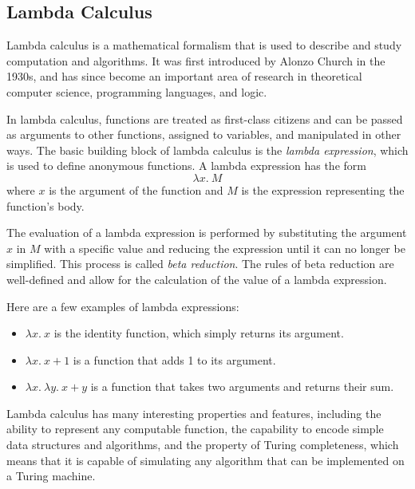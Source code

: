 \documentclass{article}
\begin{document}
\pagebreak 

\subsection*{Lambda Calculus}

Lambda calculus is a mathematical formalism that is used to describe and study computation and algorithms. It was first introduced by Alonzo Church in the 1930s, and has since become an important area of research in theoretical computer science, programming languages, and logic.

\vspace{3mm}
In lambda calculus, functions are treated as first-class citizens and can be passed as arguments to other functions, assigned to variables, and manipulated in other ways. The basic building block of lambda calculus is the \textit{lambda expression}, which is used to define anonymous functions. A lambda expression has the form $$\lambda x.\ M$$ where $x$ is the argument of the function and $M$ is the expression representing the function's body.

\vspace{3mm}
The evaluation of a lambda expression is performed by substituting the argument $x$ in $M$ with a specific value and reducing the expression until it can no longer be simplified. This process is called \textit{beta reduction}. The rules of beta reduction are well-defined and allow for the calculation of the value of a lambda expression.

\vspace{3mm}
Here are a few examples of lambda expressions:

\begin{itemize}
\item $\lambda x.\ x$ is the identity function, which simply returns its argument.
\item $\lambda x.\ x + 1$ is a function that adds 1 to its argument.
\item $\lambda x.\ \lambda y.\ x + y$ is a function that takes two arguments and returns their sum.
\end{itemize}

\vspace{3mm}
Lambda calculus has many interesting properties and features, including the ability to represent any computable function, the capability to encode simple data structures and algorithms, and the property of Turing completeness, which means that it is capable of simulating any algorithm that can be implemented on a Turing machine.
\end{document}
